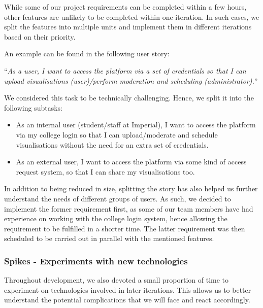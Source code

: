 \documentclass[a4paper, titlepage]{article}
\begin{document}
While some of our project requirements can be completed within a few hours, other features are unlikely to be completed within one iteration. In such cases, we split the features into multiple units and implement them in different iterations based on their priority.

An example can be found in the following user story:
\begin{center}
``\textit{As a user, I want to access the platform via a set of credentials so that I can upload visualisations (user)/perform moderation and scheduling (administrator).}'' \\
\end{center}

We considered this task to be technically challenging. Hence, we split it into the following subtasks:

\begin{itemize}

  \item As an internal user (student/staff at Imperial), I want to access the platform via my college login so that I can upload/moderate and schedule visualisations without the need for an extra set of credentials.

  \item As an external user, I want to access the platform via some kind of access request system, so that I can share my visualisations too.

\end{itemize}

In addition to being reduced in size, splitting the story has also helped us further understand the needs of different groups of users. As such, we decided to implement the former requirement first, as some of our team members have had experience on working with the college login system, hence allowing the requirement to be fulfilled in a shorter time. The latter requirement was then scheduled to be carried out in parallel with the mentioned features.

\subsubsection{Spikes - Experiments with new technologies}

Throughout development, we also devoted a small proportion of time to experiment on technologies involved in later iterations. This allows us to better understand the potential complications that we will face and react accordingly.
\end{document}
